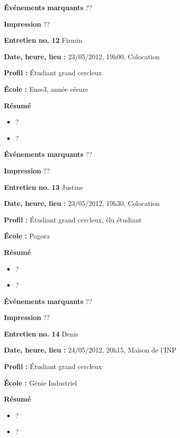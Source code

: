 \documentclass[a4paper, 11px]{article}
\begin{document}
\textbf{Événements marquants}
??

\textbf{Impression}
??



\vspace{.3cm}

 \textbf {\large Entretien no. 12}
Firmin

\textbf{Date, heure, lieu : }
23/05/2012, 19h00, Colocation

\textbf{Profil : }
Étudiant grand cercleux

\textbf{École : }
Ense3, année césure

\textbf{Résumé}
	\begin{itemize}
		\item ?
		\item ?
	\end{itemize}

\textbf{Événements marquants}
??

\textbf{Impression}
??


\vspace{.3cm}

 \textbf {\large Entretien no. 13}
Justine

\textbf{Date, heure, lieu : }
23/05/2012, 19h30, Colocation

\textbf{Profil : }
Étudiant grand cercleux, élu étudiant

\textbf{École : }
Pagora

\textbf{Résumé}
	\begin{itemize}
		\item ?
		\item ?
	\end{itemize}

\textbf{Événements marquants}
??

\textbf{Impression}
??



\vspace{.3cm}

 \textbf {\large Entretien no. 14}
Denis

\textbf{Date, heure, lieu : }
24/05/2012, 20h15, Maison de l'INP

\textbf{Profil : }
Étudiant grand cercleux

\textbf{École : }
Génie Industriel

\textbf{Résumé}
	\begin{itemize}
		\item ?
		\item ?
	\end{itemize}
\end{document}
